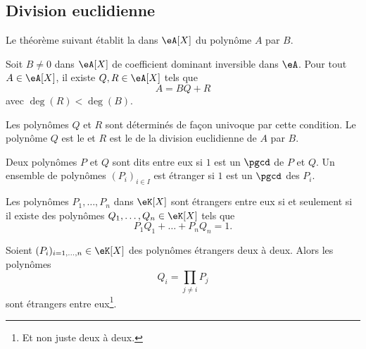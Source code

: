 \subsection{Division euclidienne}

Le théorème suivant établit la  dans \( \eA[X]\) du polynôme \( A\) par \( B\).
\begin{theorem}     \label{ThodivEuclPsFexf}
    Soit \( B\neq 0\) dans \( \eA[X]\) de coefficient dominant inversible dans \( \eA\). Pour tout \( A\in\eA[X]\), il existe \( Q,R\in \eA[X]\) tels que
    \begin{equation}
        A=BQ+R
    \end{equation}
    avec \( \deg(R)<\deg(B)\).

    Les polynômes \( Q\) et \( R\) sont déterminés de façon univoque par cette condition. Le polynôme \( Q\) est le  et \( R\) est le  de la division euclidienne de \( A\) par \( B\).
\end{theorem}

Deux polynômes \( P\) et \( Q\) sont dits  entre eux si \( 1\) est un \( \pgcd\) de \( P\) et \( Q\). Un ensemble de polynômes \( (P_i)_{i\in I}\) est étranger  si \( 1\) est un \( \pgcd\) des \( P_i\).

\begin{theorem}[Bezout] \label{ThoBezoutOuGmLB}
    Les polynômes \( P_1,\ldots,P_n\) dans \( \eK[X]\) sont étrangers entre eux si et seulement si il existe des polynômes \( Q_1,\ldots,Q_n\in\eK[X]\) tels que
    \begin{equation}
        P_1Q_1+\ldots+P_nQ_n=1.
    \end{equation}
\end{theorem}

\begin{lemma}       \label{LemuALZHn}
    Soient \( (P_i)_{i=1,\ldots,n}\in \eK[X]\) des polynômes étrangers deux à deux. Alors les polynômes \begin{equation} Q_i=\prod_{j\neq i}P_j \end{equation}
    sont étrangers entre eux\footnote{Et non juste deux à deux.}.
\end{lemma}

